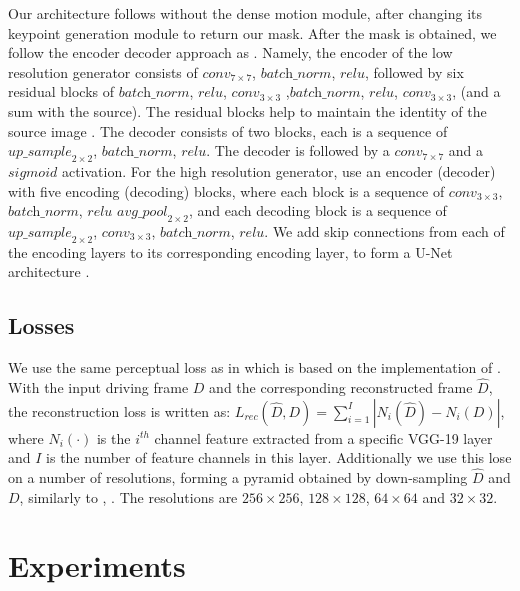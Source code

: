 \documentclass{article}
\begin{document}
Our architecture follows \cite{siarohin2020order} without the dense
motion module, after changing its keypoint generation module to return our
mask. After the mask is obtained, we follow the encoder decoder approach as
\cite{shalev2020image}.
Namely, the encoder of the low resolution generator consists of $\textit{conv}_{7
\times 7}$, $\textit{batch\_norm}$, $\textit{relu}$, followed by six
residual blocks of $\textit{batch\_norm}$, $\textit{relu}$,
$\textit{conv}_{3 \times 3}$ ,$\textit{batch\_norm}$, $\textit{relu}$,
$\textit{conv}_{3 \times 3}$, (and a sum with the source).
The residual blocks help to maintain the identity of the source image
\cite{he2015deep}.
The decoder consists of two blocks, each is a sequence of
$\textit{up\_sample}_{2 \times 2 }$, $\textit{batch\_norm}$,
$\textit{relu}$. The decoder is followed by a $\textit{conv}_{7 \times 7}$
and a $\textit{sigmoid}$ activation.
For the high resolution generator, use an encoder (decoder) with five encoding (decoding) blocks,
where each block is a sequence of
$\textit{conv}_{3 \times 3}$, $\textit{batch\_norm}$, $\textit{relu}$
$\textit{avg\_pool}_{2 \times 2}$, and each decoding block is a sequence of
$\textit{up\_sample}_{2 \times 2}$, $\textit{conv}_{3 \times 3}$,
$\textit{batch\_norm}$, $\textit{relu}$.
We add skip connections from each of the encoding layers to its
corresponding encoding layer, to form a U-Net architecture
\cite{ronneberger2015unet}.


\subsection{Losses}
We use the same perceptual loss as in \cite{siarohin2020order} which is
based on the implementation of \cite{wang2018videotovideo}. With the input
driving frame $D$ and the corresponding reconstructed frame $\hat{D}$, the
reconstruction loss is written as: $L_{rec}(\hat{D}, D) =
\sum_{i=1}^{I} |N_i(\hat{D})-N_i(D)|$, where $N_i(\cdot)$ is the $i^{th}$
channel feature extracted from a specific VGG-19 layer \cite{simonyan2015deep}
and $I$ is the number of feature channels in this layer. Additionally we use this lose on
a number of resolutions, forming a pyramid obtained by down-sampling
$\hat{D}$ and $D$, similarly to \cite{}, \cite{}. The resolutions are $256
\times 256$, $128 \times 128$, $64 \times 64$ and $32 \times 32$.


\section{Experiments}
\end{document}
